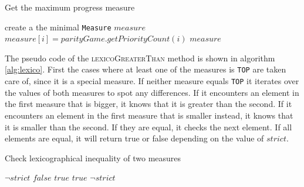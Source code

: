 \documentclass[10pt,a4paper]{article}
\newcommand{\algoname}[1]{\textnormal{\textsc{#1}}}
\begin{document}
\begin{algorithm}
\caption{Get the maximum progress measure}\label{alg:getProgMeas}
\begin{algorithmic}[1]
		\State create a the minimal \texttt{Measure} $measure$		
			\State $measure[i] = parityGame.getPriorityCount(i)$
		\EndFor
		\State \Return $measure$
	\EndProcedure
\end{algorithmic}
\end{algorithm}

The pseudo code of the \algoname{lexicoGreaterThan} method is shown in algorithm \ref{alg:lexico}. First the cases where at least one of the measures is \texttt{TOP} are taken care of, since it is a special measure. If neither measure equals \texttt{TOP} it iterates over the values of both measures to spot any differences. If it encounters an element in the first measure that is bigger, it knows that it is greater than the second. If it encounters an element in the first measure that is smaller instead, it knows that it is smaller than the second. If they are equal, it checks the next element. If all elements are equal, it will return true or false depending on the value of $strict$.

\begin{algorithm}
\caption{Check lexicographical inequality of two measures}\label{alg:lexico}
\begin{algorithmic}[1]
				\State \Return $\neg strict$
			\Else
				\State \Return $\textit{false}$
			\EndIf
		\Else
				\State \Return $\textit{true}$
			\Else
						\State \Return $\textit{true}$
					\EndIf
				\EndFor
				\State \Return $\neg strict$
			\EndIf
		\EndIf
	\EndProcedure
\end{algorithmic}
\end{algorithm}
\end{document}
